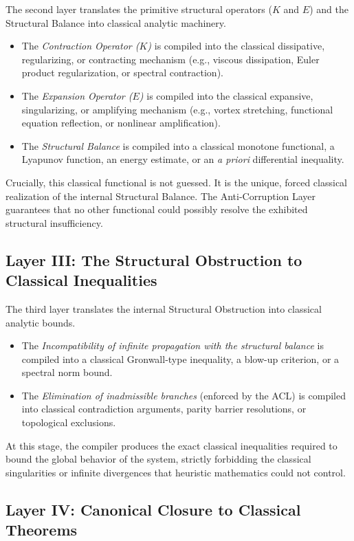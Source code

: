 \documentclass[12pt,openany]{extbook}
\theoremstyle{plain}
\theoremstyle{definition}
\begin{document}
The second layer translates the primitive structural operators ($K$ and $E$) and the Structural Balance into classical analytic machinery.
\begin{itemize}
    \item The \emph{Contraction Operator ($K$)} is compiled into the classical dissipative, regularizing, or contracting mechanism (e.g., viscous dissipation, Euler product regularization, or spectral contraction).
    \item The \emph{Expansion Operator ($E$)} is compiled into the classical expansive, singularizing, or amplifying mechanism (e.g., vortex stretching, functional equation reflection, or nonlinear amplification).
    \item The \emph{Structural Balance} is compiled into a classical monotone functional, a Lyapunov function, an energy estimate, or an \emph{a priori} differential inequality.
\end{itemize}
Crucially, this classical functional is not guessed. It is the unique, forced classical realization of the internal Structural Balance. The Anti-Corruption Layer guarantees that no other functional could possibly resolve the exhibited structural insufficiency.

\subsection{Layer III: The Structural Obstruction to Classical Inequalities}

The third layer translates the internal Structural Obstruction into classical analytic bounds.
\begin{itemize}
    \item The \emph{Incompatibility of infinite propagation with the structural balance} is compiled into a classical Gronwall-type inequality, a blow-up criterion, or a spectral norm bound.
    \item The \emph{Elimination of inadmissible branches} (enforced by the ACL) is compiled into classical contradiction arguments, parity barrier resolutions, or topological exclusions.
\end{itemize}
At this stage, the compiler produces the exact classical inequalities required to bound the global behavior of the system, strictly forbidding the classical singularities or infinite divergences that heuristic mathematics could not control.

\subsection{Layer IV: Canonical Closure to Classical Theorems}
\end{document}
